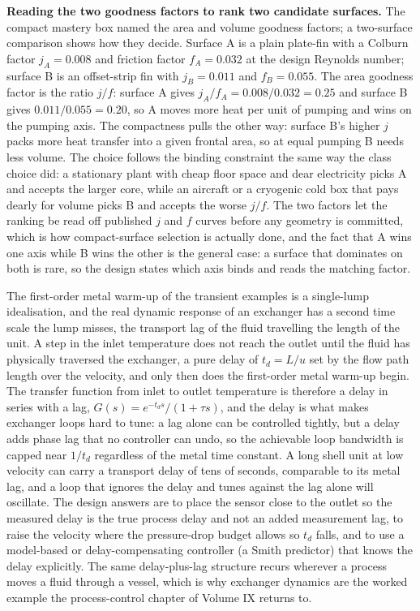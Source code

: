 \textbf{Reading the two goodness factors to rank two candidate surfaces.} The compact
mastery box named the area and volume goodness factors; a two-surface comparison shows
how they decide. Surface A is a plain plate-fin with a Colburn factor $j_A = 0.008$ and
friction factor $f_A = 0.032$ at the design Reynolds number; surface B is an
offset-strip fin with $j_B = 0.011$ and $f_B = 0.055$. The area goodness factor is the
ratio $j/f$: surface A gives $j_A/f_A = 0.008/0.032 = 0.25$ and surface B gives
$0.011/0.055 = 0.20$, so A moves more heat per unit of pumping and wins on the pumping
axis. The compactness pulls the other way: surface B's higher $j$ packs more heat
transfer into a given frontal area, so at equal pumping B needs less volume. The choice
follows the binding constraint the same way the class choice did: a stationary plant
with cheap floor space and dear electricity picks A and accepts the larger core, while
an aircraft or a cryogenic cold box that pays dearly for volume picks B and accepts the
worse $j/f$. The two factors let the ranking be read off published $j$ and $f$ curves
before any geometry is committed, which is how compact-surface selection is actually
done, and the fact that A wins one axis while B wins the other is the general case: a
surface that dominates on both is rare, so the design states which axis binds and reads
the matching factor.

\begin{mastery}
The first-order metal warm-up of the transient examples is a single-lump idealisation,
and the real dynamic response of an exchanger has a second time scale the lump misses,
the transport lag of the fluid travelling the length of the unit. A step in the inlet
temperature does not reach the outlet until the fluid has physically traversed the
exchanger, a pure delay of $t_d = L/u$ set by the flow path length over the velocity,
and only then does the first-order metal warm-up begin. The transfer function from
inlet to outlet temperature is therefore a delay in series with a lag, $G(s) =
e^{-t_d s}/(1 + \tau s)$, and the delay is what makes exchanger loops hard to tune: a
lag alone can be controlled tightly, but a delay adds phase lag that no controller can
undo, so the achievable loop bandwidth is capped near $1/t_d$ regardless of the metal
time constant. A long shell unit at low velocity can carry a transport delay of tens
of seconds, comparable to its metal lag, and a loop that ignores the delay and tunes
against the lag alone will oscillate. The design answers are to place the sensor close
to the outlet so the measured delay is the true process delay and not an added
measurement lag, to raise the velocity where the pressure-drop budget allows so $t_d$
falls, and to use a model-based or delay-compensating controller (a Smith predictor)
that knows the delay explicitly. The same delay-plus-lag structure recurs wherever a
process moves a fluid through a vessel, which is why exchanger dynamics are the worked
example the process-control chapter of Volume IX returns to.
\end{mastery}

